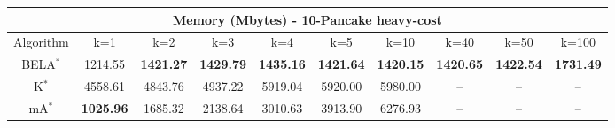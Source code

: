 \begin{tabular}{c|ccccccccc}\toprule
\multicolumn{10}{c}{Memory (Mbytes) - 10-Pancake heavy-cost}\\ \midrule
Algorithm & k=1 & k=2 & k=3 & k=4 & k=5 & k=10 & k=40 & k=50 & k=100 \\ \midrule
BELA$^*$ & 1214.55 & \textbf{1421.27} & \textbf{1429.79} & \textbf{1435.16} & \textbf{1421.64} & \textbf{1420.15} & \textbf{1420.65} & \textbf{1422.54} & \textbf{1731.49} \\
K$^*$ & 4558.61 & 4843.76 & 4937.22 & 5919.04 & 5920.00 & 5980.00 & -- & -- & -- \\
mA$^*$ & \textbf{1025.96} & 1685.32 & 2138.64 & 3010.63 & 3913.90 & 6276.93 & -- & -- & -- \\ \bottomrule 
\end{tabular}
